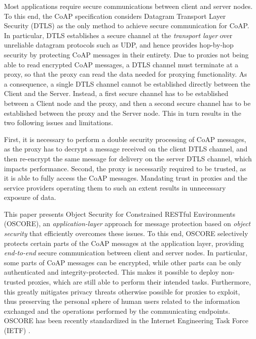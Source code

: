 {Most applications require secure communications between client and server nodes. To this end, the CoAP specification \cite{rfc7252} considers Datagram Transport Layer Security (DTLS) \cite{rfc6347} as the only method to achieve secure communication for CoAP. In particular, DTLS establishes a secure channel at the \emph{transport layer} over unreliable datagram protocols such as UDP, and hence provides hop-by-hop security by protecting CoAP messages in their entirety. Due to proxies not being able to read encrypted CoAP messages, a DTLS channel must terminate at a proxy, so that the proxy can read the data needed for proxying functionality. As a consequence, a single DTLS channel cannot be established directly between the Client and the Server. Instead, a first secure channel has to be established between a Client node and the proxy, and then a second secure channel has to be established between the proxy and the Server node. This in turn results in the two following issues and limitations.

First, it is necessary to perform a double security processing of CoAP messages, as the proxy has to decrypt a message received on the client DTLS channel, and then re-encrypt the same message for delivery on the server DTLS channel, which impacts performance. Second, the proxy is necessarily required to be trusted, as it is able to fully access the CoAP messages. Mandating trust in proxies and the service providers operating them to such an extent results in unnecessary exposure of data.

This paper presents Object Security for Constrained RESTful Environments (OSCORE), an \emph{application-layer} approach for message protection based on \emph{object security} that efficiently overcomes these issues. To this end, OSCORE selectively protects certain parts of the CoAP messages at the application layer, providing \emph{end-to-end} secure communication between client and server nodes. In particular, some parts of CoAP messages can be encrypted, while other parts can be only authenticated and integrity-protected. This makes it possible to deploy non-trusted proxies, which are still able to perform their intended tasks. Furthermore, this greatly mitigates privacy threats otherwise possible for proxies to exploit, thus preserving the personal sphere of human users related to the information exchanged and the operations performed by the communicating endpoints. OSCORE has been recently standardized in the Internet Engineering Task Force (IETF) \cite{cite:oscoap}.

}
